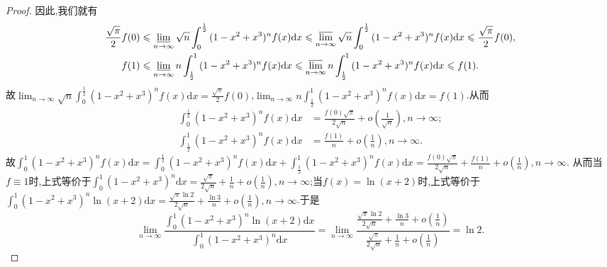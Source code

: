 \documentclass[../../main.tex]{subfiles}
\begin{document}
\begin{proof}
因此,我们就有
\begin{align*}
\frac{\sqrt{\pi}}{2}f(0)&\leqslant \varliminf_{n\rightarrow\infty}\sqrt{n}\int_0^{\frac{1}{2}}{(1 - x^2 + x^3)^nf(x)\mathrm{d}x}\leqslant \varlimsup_{n\rightarrow\infty}\sqrt{n}\int_0^{\frac{1}{2}}{(1 - x^2 + x^3)^nf(x)\mathrm{d}x}\leqslant \frac{\sqrt{\pi}}{2}f(0),\\
f(1)&\leqslant \varliminf_{n\rightarrow\infty}n\int_{\frac{1}{2}}^1{(1 - x^2 + x^3)^nf(x)\mathrm{d}x}\leqslant \varlimsup_{n\rightarrow\infty}n\int_{\frac{1}{2}}^1{(1 - x^2 + x^3)^nf(x)\mathrm{d}x}\leqslant f(1).
\end{align*}
故\(\lim_{n\rightarrow\infty}\sqrt{n}\int_0^{\frac{1}{2}}{(1 - x^2 + x^3)^nf(x)\mathrm{d}x}=\frac{\sqrt{\pi}}{2}f(0)\),\(\lim_{n\rightarrow\infty}n\int_{\frac{1}{2}}^1{(1 - x^2 + x^3)^nf(x)\mathrm{d}x}=f(1)\).从而
\begin{align*}
\int_0^{\frac{1}{2}}{(1 - x^2 + x^3)^nf(x)\mathrm{d}x}&=\frac{f(0)\sqrt{\pi}}{2\sqrt{n}}+o\left(\frac{1}{\sqrt{n}}\right),  n\rightarrow\infty;\\
\int_{\frac{1}{2}}^1{(1 - x^2 + x^3)^nf(x)\mathrm{d}x}&=\frac{f(1)}{n}+o\left(\frac{1}{n}\right),  n\rightarrow\infty.
\end{align*}
故\(\int_0^1{(1 - x^2 + x^3)^nf(x)\mathrm{d}x}=\int_0^{\frac{1}{2}}{(1 - x^2 + x^3)^nf(x)\mathrm{d}x}+\int_{\frac{1}{2}}^1{(1 - x^2 + x^3)^nf(x)\mathrm{d}x}=\frac{f(0)\sqrt{\pi}}{2\sqrt{n}}+\frac{f(1)}{n}+o\left(\frac{1}{n}\right),  n\rightarrow\infty\).
从而当\(f\equiv 1\)时,上式等价于\(\int_0^1{(1 - x^2 + x^3)^n\mathrm{d}x}=\frac{\sqrt{\pi}}{2\sqrt{n}}+\frac{1}{n}+o\left(\frac{1}{n}\right),  n\rightarrow\infty\);当\(f(x) = \ln(x + 2)\)时,上式等价于\(\int_0^1{(1 - x^2 + x^3)^n\ln(x + 2)\mathrm{d}x}=\frac{\sqrt{\pi}\ln 2}{2\sqrt{n}}+\frac{\ln 3}{n}+o\left(\frac{1}{n}\right),  n\rightarrow\infty\).于是
\[
\lim_{n\rightarrow\infty}\frac{\int_0^1{(1 - x^2 + x^3)^n\ln(x + 2)\mathrm{d}x}}{\int_0^1{(1 - x^2 + x^3)^n\mathrm{d}x}}=\lim_{n\rightarrow\infty}\frac{\frac{\sqrt{\pi}\ln 2}{2\sqrt{n}}+\frac{\ln 3}{n}+o\left(\frac{1}{n}\right)}{\frac{\sqrt{\pi}}{2\sqrt{n}}+\frac{1}{n}+o\left(\frac{1}{n}\right)}=\ln 2.
\]
\end{proof}
\end{document}
